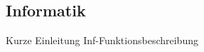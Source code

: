 \documentclass[main.tex]{subfiles} %
\begin{document}

\subsection{Informatik}

Kurze Einleitung Inf-Funktionsbeschreibung


\newpage


\newpage


\newpage


\newpage
\end{document}
